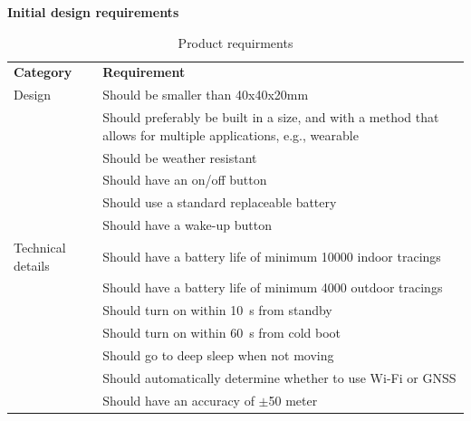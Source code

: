 \textbf{Initial design requirements}
\begin{table}[H]
\centering
\caption{Product requirments}
\label{tab:product_requirements}
\begin{tabular}{lp{12cm}}
\textbf{Category} & \textbf{Requirement}                                                                                                \\
Design            & Should be smaller than 40x40x20mm                                                                                   \\
                  & Should preferably be built in a size, and with a method that allows for multiple applications, e.g., wearable \\
                  & Should be weather resistant                                                                                         \\
                  & Should have an on/off button                                                                                        \\
                  & Should use a standard replaceable battery                                                                          \\
                  & Should have a wake-up button                                                                                       \\
Technical details & Should have a battery life of minimum 10000 indoor tracings                                                        \\
                  & Should have a battery life of minimum 4000 outdoor tracings                                                        \\
                  & Should turn on within \SI{10}{\second} from standby                                                                      \\
                  & Should turn on within \SI{60}{\second} from cold boot                                                                    \\
                  & Should go to deep sleep when not moving                                                                             \\
                  & Should automatically determine whether to use Wi-Fi or \ac{GNSS}                                                          \\
                  & Should have an accuracy of $\pm$50 meter                                                                              
\end{tabular}%
\end{table}

